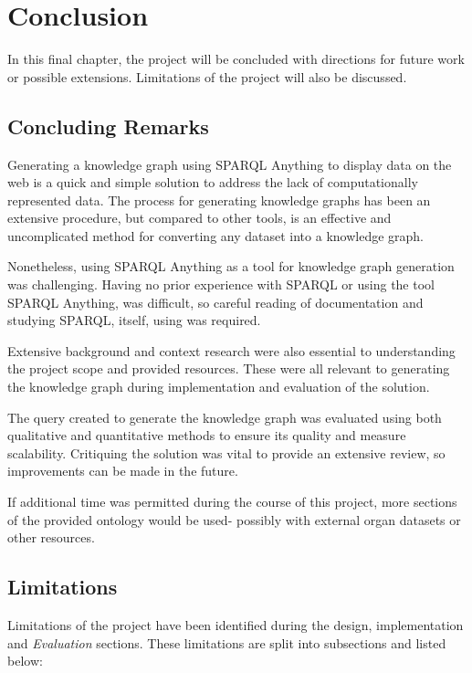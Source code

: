 \chapter{Conclusion}
In this final chapter, the project will be concluded with directions for future work or possible extensions. Limitations of the project will also be discussed. 

\section{Concluding Remarks}
\hspace{0.5cm} Generating a knowledge graph using SPARQL Anything to display data on the web is a quick and simple solution to address the lack of computationally represented data. The process for generating knowledge graphs has been an extensive procedure, but compared to other tools, is an effective and uncomplicated method for converting any dataset into a knowledge graph. 

Nonetheless, using SPARQL Anything as a tool for knowledge graph generation was challenging. Having no prior experience with SPARQL or using the tool SPARQL Anything, was difficult, so careful reading of documentation \cite{sparqlanythinggithub} and studying SPARQL, itself, using \cite{sparlbook} was required. 

Extensive background and context research were also essential to understanding the project scope and provided resources. These were all relevant to generating the knowledge graph during implementation and evaluation of the solution. 

The query created to generate the knowledge graph was evaluated using both qualitative and quantitative methods to ensure its quality and measure scalability. Critiquing the solution was vital to provide an extensive review, so improvements can be made in the future. 

If additional time was permitted during the course of this project, more sections of the provided ontology would be used- possibly with external organ datasets or other resources. 

\section{Limitations}
Limitations of the project have been identified during the design, implementation and \textit{Evaluation} sections. These limitations are split into subsections and listed below:

